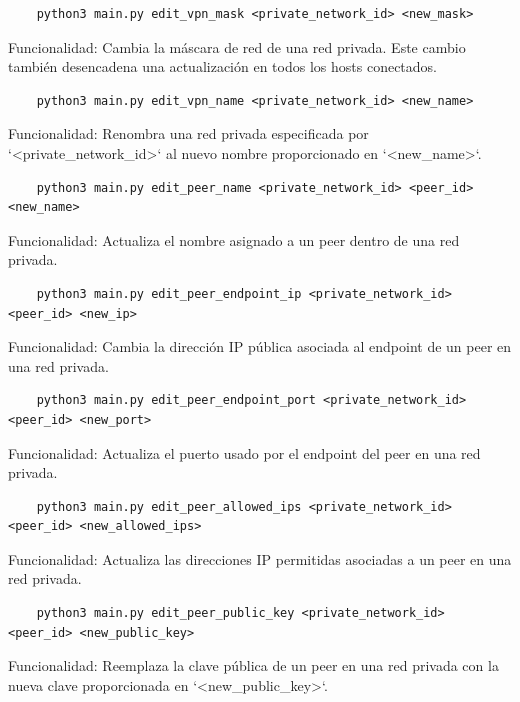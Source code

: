     \begin{verbatim}
    python3 main.py edit_vpn_mask <private_network_id> <new_mask>
    \end{verbatim}
    Funcionalidad:  
    Cambia la máscara de red de una red privada. Este cambio también desencadena una actualización en todos los hosts conectados.
    
    \begin{verbatim}
    python3 main.py edit_vpn_name <private_network_id> <new_name>
    \end{verbatim}
    Funcionalidad:  
    Renombra una red privada especificada por `<private_network_id>` al nuevo nombre proporcionado en `<new_name>`.
    
   
    
    
    \begin{verbatim}
    python3 main.py edit_peer_name <private_network_id> <peer_id> <new_name>
    \end{verbatim}
    Funcionalidad:  
    Actualiza el nombre asignado a un peer dentro de una red privada.
    
    \begin{verbatim}
    python3 main.py edit_peer_endpoint_ip <private_network_id> <peer_id> <new_ip>
    \end{verbatim}
    Funcionalidad:  
    Cambia la dirección IP pública asociada al endpoint de un peer en una red privada.
    
    \begin{verbatim}
    python3 main.py edit_peer_endpoint_port <private_network_id> <peer_id> <new_port>
    \end{verbatim}
    Funcionalidad:  
    Actualiza el puerto usado por el endpoint del peer en una red privada.
    
    \begin{verbatim}
    python3 main.py edit_peer_allowed_ips <private_network_id> <peer_id> <new_allowed_ips>
    \end{verbatim}
    Funcionalidad:  
    Actualiza las direcciones IP permitidas asociadas a un peer en una red privada.
    
    \begin{verbatim}
    python3 main.py edit_peer_public_key <private_network_id> <peer_id> <new_public_key>
    \end{verbatim}
    Funcionalidad:  
    Reemplaza la clave pública de un peer en una red privada con la nueva clave proporcionada en `<new_public_key>`.
     
